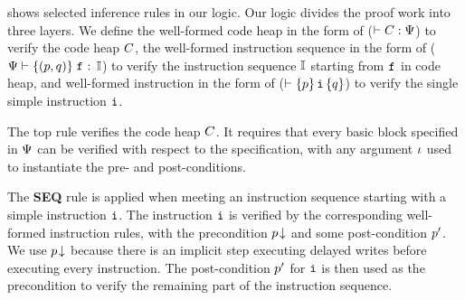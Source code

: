\Fig{\ref{fig:Seleted Inference rules}} shows
selected inference rules in our logic.
{\color{blue}
Our logic divides the proof work into three layers.
We define the well-formed code heap in the form of
($\vdash {C} : {\Psi{}}$) to verify the code heap $C$,
the well-formed instruction sequence in the form of
($\Psi \vdash \{({p}, {q})\} \; {\texttt{f}_{}} : \, {\mathbb{I}}$) to verify the
instruction sequence $\mathbb{I}$ starting from $\texttt{f}_{}$
in code heap, and well-formed instruction in the form of
($\vdash \{{p}\} \, {\texttt{i}{}} \, \{{q}\}$) to verify the
single simple instruction $\texttt{i}{}$.
}

The top rule \cdhp{} verifies the code
heap $C$. It requires that every basic block
specified in $\Psi$ can be verified with
respect to the specification, with any
argument $\iota$ used to instantiate the
pre- and post-conditions.


The \textbf{SEQ} rule is applied
when meeting an instruction sequence
starting with a simple instruction $\texttt{i}$.
The instruction $\texttt{i}$ is verified by the
corresponding well-formed instruction rules,
with the precondition ${p}\!\downarrow$ and some
post-condition $p'$. We use ${p}\!\downarrow$
because there is an implicit step executing delayed
writes before executing every instruction.
The post-condition $p'$ for $\texttt{i}$ is then
used as the precondition to verify
the remaining part of the instruction sequence.
%

